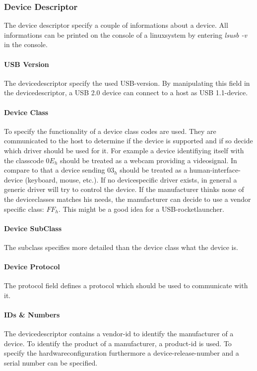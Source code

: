 \documentclass{acm_proc_article-sp}
\begin{document}
\subsubsection{Device Descriptor} %
The device descriptor specify a couple of informations about a device.
All informations can be printed on the console of a linuxsystem by entering \emph{lsusb -v} in the console.
\paragraph{USB Version}
The devicedescriptor specify the used USB-version. By manipulating this field in the devicedescriptor, a USB 2.0 device can connect to a host as USB 1.1-device.
\paragraph{Device Class}
To specify the functionality of a device class codes are used. They are communicated to the host to determine if the device is supported and if so decide which driver should be used for it. For example a device identifiying itself with the classcode $0E_h$ should be treated as a webcam providing a videosignal. In compare to that a device sending $03_h$ should be treated as a human-interface-device (keyboard, mouse, etc.).
If no devicespecific driver exists, in general a generic driver will try to control the device. If the manufacturer thinks none of the deviceclasses matches his needs, the manufacturer can decide to use a vendor specific class: $FF_h$. This might be a good idea for a USB-rocketlauncher.
\paragraph{Device SubClass}
The subclass specifies more detailed than the device class what the device is.
\paragraph{Device Protocol}
The protocol field defines a protocol which should be used to communicate with it.
\paragraph{IDs \& Numbers}
The devicedescriptor contains a vendor-id to identify the manufacturer of a device.
To identify the product of a manufacturer, a product-id is used. To specify the hardwareconfiguration furthermore a device-release-number and a serial number can be specified.
\end{document}
